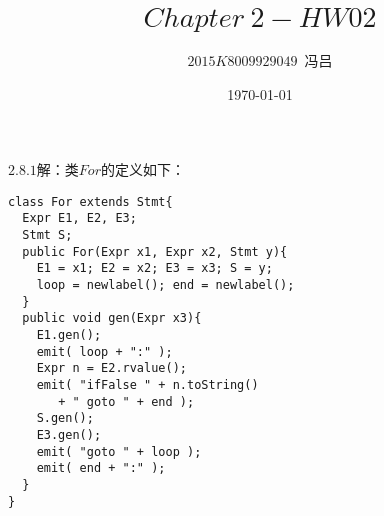 \documentclass[UTF8,noindent]{ctexart}
\title{$Chapter\ 2-HW02$}
\author{$2015K8009929049$\ 冯吕}
\date{\today}
\begin{document}
\maketitle
{}
$2.8.1$解：类$For$的定义如下：
\begin{lstlisting}
class For extends Stmt{
  Expr E1, E2, E3;
  Stmt S;
  public For(Expr x1, Expr x2, Stmt y){
	E1 = x1; E2 = x2; E3 = x3; S = y;
	loop = newlabel(); end = newlabel();
  }
  public void gen(Expr x3){
	E1.gen();
	emit( loop + ":" );
	Expr n = E2.rvalue();
	emit( "ifFalse " + n.toString() 
	   + " goto " + end );
	S.gen();
	E3.gen();
	emit( "goto " + loop );
	emit( end + ":" );
  }
}
\end{lstlisting}
\end{document}
